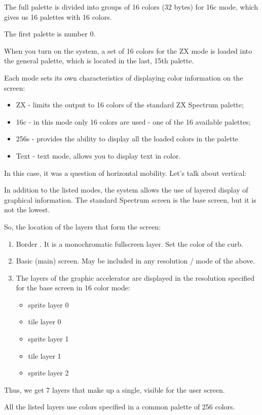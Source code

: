 The full palette is divided into groups of 16 colors (32 bytes) for
16c mode, which gives us 16 palettes with 16 colors.

The first palette is number 0.

When you turn on the system, a set of 16 colors for the ZX mode is
loaded into the general palette, which is located in the last, 15th
palette.

Each mode sets its own characteristics of displaying color information
on the screen:
\begin{itemize}
\item[] ZX - limits the output to 16 colors of the standard ZX
  Spectrum palette;
\item[] 16c - in this mode only 16 colors are used - one of the 16
  available palettes;
\item[] 256s - provides the ability to display all the loaded colors
  in the palette
\item[] Text - text mode, allows you to display text in color.
\end{itemize}
In this case, it was a question of horizontal mobility. Let's talk
about vertical:

In addition to the listed modes, the system allows the use of layered
display of graphical information. The standard Spectrum screen is the
base screen, but it is not the lowest.

So, the location of the layers that form the screen:
\begin{enumerate}
\item Border . It is a monochromatic fullscreen layer. Set the color
  of the curb.
\item Basic (main) screen. May be included in any resolution / mode of
  the above.
\item The layers of the graphic accelerator are displayed in the
  resolution specified for the base screen in 16 color mode:
  \begin{itemize}
  \item sprite layer 0
  \item tile layer 0
  \item sprite layer 1
  \item tile layer 1
  \item sprite layer 2
  \end{itemize}
\end{enumerate}
Thus, we get 7 layers that make up a single, visible for the user
screen.

All the listed layers use colors specified in a common palette of 256
colors.

